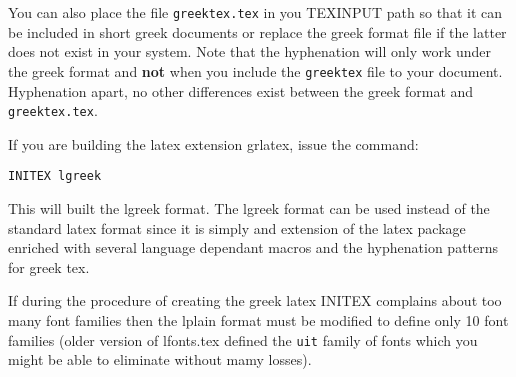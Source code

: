 You can also place the file {\tt greektex.tex} in you TEXINPUT path
so that it can be included in short greek documents or replace the
greek format file if the latter does not exist in your system. Note
that the hyphenation will only work under the greek format and {\bf
not} when you include the {\tt greektex} file to your document.
Hyphenation apart, no other differences exist between the greek
format and {\tt greektex.tex}.


If you are building the latex extension grlatex, issue the command:\par
{\tt INITEX lgreek}\par
This will built the lgreek format. The lgreek format can be used
instead of the standard latex format since it is simply and extension
of the latex package enriched with several language dependant macros
and the hyphenation patterns for greek tex. 

If during the procedure of creating the greek latex INITEX complains
about too many font families then the lplain format must be modified
to define only 10 font families (older version of lfonts.tex defined
the {\tt uit} family of fonts which you might be able to eliminate
without mamy losses).



\bye
